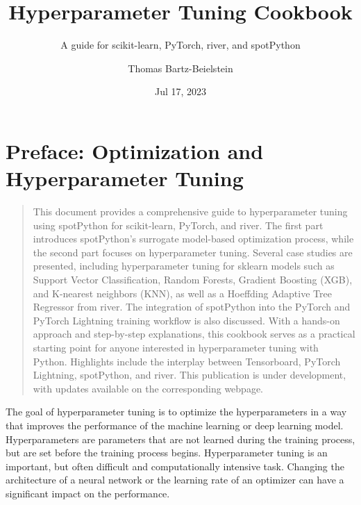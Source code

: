 \documentclass[
  letterpaper,
  DIV=11,
  numbers=noendperiod]{scrreprt}
\title{Hyperparameter Tuning Cookbook}
\subtitle{A guide for scikit-learn, PyTorch, river, and spotPython}
\author{Thomas Bartz-Beielstein}
\date{Jul 17, 2023}
\renewcommand*\contentsname{Table of contents}
\newcommand\contentsname{Table of contents}
\begin{document}
\maketitle
\ifdefined\Shaded\renewenvironment{Shaded}{\begin{tcolorbox}[interior hidden, borderline west={3pt}{0pt}{shadecolor}, sharp corners, enhanced, breakable, frame hidden, boxrule=0pt]}{\end{tcolorbox}}\fi

\renewcommand*\contentsname{Table of contents}
{
\hypersetup{linkcolor=}
\setcounter{tocdepth}{2}
\tableofcontents
}

\hypertarget{preface-optimization-and-hyperparameter-tuning}{%
\chapter*{Preface: Optimization and Hyperparameter
Tuning}\label{preface-optimization-and-hyperparameter-tuning}}


\begin{quote}
This document provides a comprehensive guide to hyperparameter tuning
using spotPython for scikit-learn, PyTorch, and river. The first part
introduces spotPython's surrogate model-based optimization process,
while the second part focuses on hyperparameter tuning. Several case
studies are presented, including hyperparameter tuning for sklearn
models such as Support Vector Classification, Random Forests, Gradient
Boosting (XGB), and K-nearest neighbors (KNN), as well as a Hoeffding
Adaptive Tree Regressor from river. The integration of spotPython into
the PyTorch and PyTorch Lightning training workflow is also discussed.
With a hands-on approach and step-by-step explanations, this cookbook
serves as a practical starting point for anyone interested in
hyperparameter tuning with Python. Highlights include the interplay
between Tensorboard, PyTorch Lightning, spotPython, and river. This
publication is under development, with updates available on the
corresponding webpage.
\end{quote}

The goal of hyperparameter tuning is to optimize the hyperparameters in
a way that improves the performance of the machine learning or deep
learning model. Hyperparameters are parameters that are not learned
during the training process, but are set before the training process
begins. Hyperparameter tuning is an important, but often difficult and
computationally intensive task. Changing the architecture of a neural
network or the learning rate of an optimizer can have a significant
impact on the performance.
\end{document}
